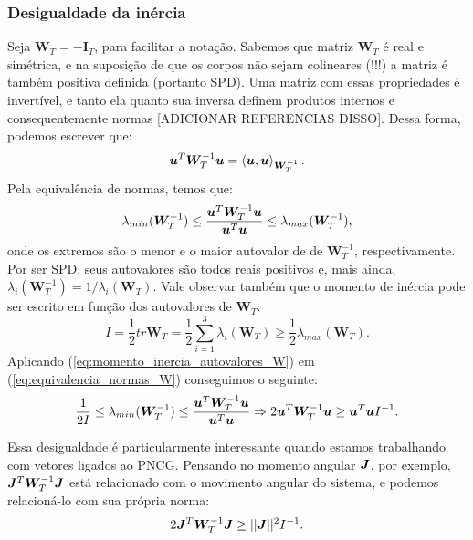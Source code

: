 \subsubsection{Desigualdade da inércia}
Seja $\bm W_T = - \bm I_T$, para facilitar a notação. Sabemos que matriz $\bm W_T$ é real e simétrica, e na suposição de que os corpos não sejam colineares (!!!) a matriz é também positiva definida (portanto SPD). Uma matriz com essas propriedades é invertível, e tanto ela quanto sua inversa definem produtos internos e consequentemente normas [ADICIONAR REFERENCIAS DISSO]. Dessa forma, podemos escrever que:
\begin{equation}
    \bm u^T \bm W_T^{-1} \bm u = \left\langle \bm u, \bm u \right\rangle_{\bm W_T^{-1}}.
\end{equation}
Pela equivalência de normas, temos que:
\begin{equation}\label{eq:equivalencia_normas_W}
    \lambda_{min} (\bm W_T^{-1}) \leq \dfrac{\bm u^T \bm W_T^{-1} \bm u}{\bm u^T \bm u} \leq \lambda_{max} (\bm W_T^{-1}),
\end{equation}
onde os extremos são o menor e o maior autovalor de de $\bm W_T^{-1}$, respectivamente. Por ser SPD, seus autovalores são todos reais positivos e, mais ainda, $\lambda_i (\bm W_T^{-1}) = 1/\lambda_i(\bm W_T)$. Vale observar também que o momento de inércia pode ser escrito em função dos autovalores de $\bm W_T$:
\begin{equation}\label{eq:momento_inercia_autovalores_W}
    I = \dfrac{1}{2} tr \bm W_T = \dfrac{1}{2} \sum_{i=1}^3 \lambda_i (\bm W_T) \geq \dfrac{1}{2} \lambda_{max}(\bm W_T).
\end{equation}
Aplicando (\ref{eq:momento_inercia_autovalores_W}) em (\ref{eq:equivalencia_normas_W}) conseguimos o seguinte:
\begin{equation}\label{eq:desigualdade_inercia}
    \dfrac{1}{2I} \leq \lambda_{min} (\bm W_T^{-1}) \leq \dfrac{\bm u^T \bm W_T^{-1} \bm u}{\bm u^T \bm u}
    \Rightarrow
    2 \bm u^T \bm W_T^{-1} \bm u \geq \bm u^T \bm u I^{-1}.
\end{equation}

Essa desigualdade é particularmente interessante quando estamos trabalhando com vetores ligados ao PNCG. Pensando no momento angular $\bm J$, por exemplo, $\bm J^T \bm W_T^{-1} \bm J$ está relacionado com o movimento angular do sistema, e podemos relacioná-lo com sua própria norma:
\begin{equation}\label{eq:desigualdade_inercia_angular}
    2 \bm J^T \bm W_T^{-1} \bm J \geq || \bm J ||^2 I^{-1}.
\end{equation}
